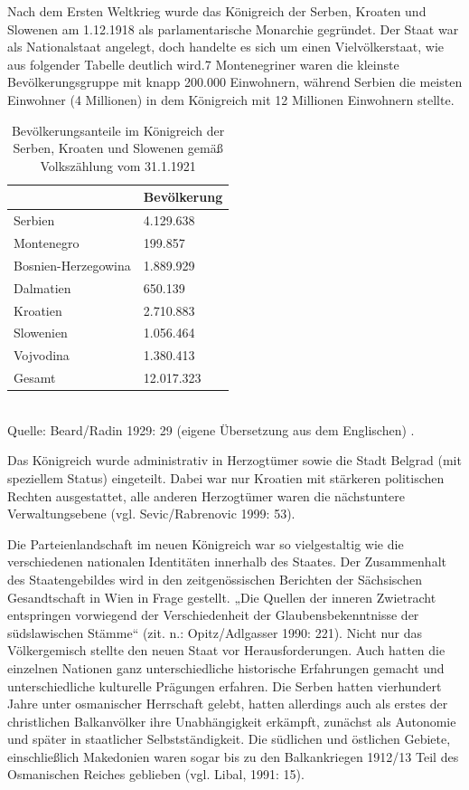 Nach dem Ersten Weltkrieg wurde das Königreich der Serben, Kroaten und Slowenen am 1.12.1918 als parlamentarische Monarchie gegründet. Der Staat war als Nationalstaat angelegt, doch handelte es sich um einen Vielvölkerstaat, wie aus folgender Tabelle deutlich wird.7 Montenegriner waren die kleinste Bevölkerungsgruppe mit knapp 200.000 Einwohnern, während Serbien die meisten Einwohner (4 Millionen) in dem Königreich mit 12 Millionen Einwohnern stellte.
\begin{table}[H]
\caption[Bevölkerungsanteile im Königreich der Serben, Kroaten und Slowenen]{Bevölkerungsanteile im Königreich der Serben, Kroaten und Slowenen gemäß Volkszählung vom 31.1.1921}
\center

\begin{tabular}{|R{46mm}|R{25mm}|}\hline
&Bevölkerung\\\hline
Serbien &4.129.638\\\hline
Montenegro&199.857\\\hline
Bosnien-Herzegowina&1.889.929\\\hline
Dalmatien&650.139\\\hline
Kroatien&2.710.883\\\hline
Slowenien&1.056.464\\\hline
Vojvodina&1.380.413\\\hline
Gesamt&12.017.323\\\hline
\end{tabular}\\
\vspace{0,5cm}
\scriptsize{Quelle: Beard/Radin 1929: 29 (eigene Übersetzung aus dem Englischen) .} 
\end{table}
Das Königreich wurde administrativ in Herzogtümer sowie die Stadt Belgrad (mit speziellem Status) eingeteilt. Dabei war nur Kroatien mit stärkeren politischen Rechten ausgestattet, alle anderen Herzogtümer waren die nächstuntere Verwaltungsebene (vgl. Sevic/Rabrenovic 1999: 53).\par
Die Parteienlandschaft im neuen Königreich war so vielgestaltig wie die verschiedenen nationalen Identitäten innerhalb des Staates. Der Zusammenhalt des Staatengebildes wird in den zeitgenössischen Berichten der Sächsischen Gesandtschaft in Wien in Frage gestellt. „Die Quellen der inneren Zwietracht entspringen vorwiegend der Verschiedenheit der Glaubensbekenntnisse der südslawischen Stämme“ (zit. n.: Opitz/Adlgasser 1990: 221). Nicht nur das Völkergemisch stellte den neuen Staat vor Herausforderungen. Auch hatten die einzelnen Nationen ganz unterschiedliche historische Erfahrungen gemacht und unterschiedliche kulturelle Prägungen erfahren. Die Serben hatten vierhundert Jahre unter osmanischer Herrschaft gelebt, hatten allerdings auch als erstes der christlichen Balkanvölker ihre Unabhängigkeit erkämpft, zunächst als Autonomie und später in staatlicher Selbstständigkeit. Die südlichen und östlichen Gebiete, einschließlich Makedonien waren sogar bis zu den Balkankriegen 1912/13 Teil des Osmanischen Reiches geblieben (vgl. Libal, 1991: 15).
